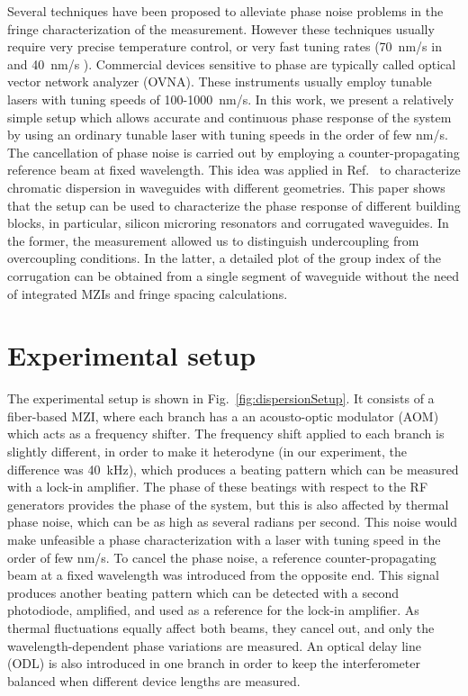 \documentclass[journal]{IEEEtran}
\begin{document}
Several techniques have been proposed to alleviate phase noise problems in the fringe characterization of the measurement.
However these techniques usually require very precise temperature control, or very fast tuning rates (70~nm/s in \cite{Vanwiggeren2003} and 40~nm/s \cite{Gifford2005}).
Commercial devices sensitive to phase are typically called optical vector network analyzer (OVNA).
These instruments usually employ tunable lasers with tuning speeds of 100-1000~nm/s.
In this work, we present a relatively simple setup which allows accurate and continuous phase response of the system by using an ordinary tunable laser with tuning speeds in the order of few nm/s.
The cancellation of phase noise is carried out by employing a counter-propagating reference beam at fixed wavelength.
This idea was applied in Ref.~\cite{Mas2012} to characterize chromatic dispersion in waveguides with different geometries.
This paper shows that the setup can be used to characterize the phase response of different building blocks, in particular, silicon microring resonators and corrugated waveguides.
In the former, the measurement allowed us to distinguish undercoupling from overcoupling conditions.
In the latter, a detailed plot of the group index of the corrugation can be obtained from a single segment of waveguide without the need of integrated MZIs and fringe spacing calculations.


\section{Experimental setup}
The experimental setup is shown in Fig.~\ref{fig:dispersionSetup}.
It consists of a fiber-based MZI, where each branch has a an acousto-optic modulator (AOM) which acts as a frequency shifter.
The frequency shift applied to each branch is slightly different, in order to make it heterodyne (in our experiment, the difference was 40~kHz), which produces a beating pattern which can be measured with a lock-in amplifier.
The phase of these beatings with respect to the RF generators provides the phase of the system, but this is also affected by thermal phase noise, which can be as high as several radians per second.
This noise would make unfeasible a phase characterization with a laser with tuning speed in the order of few nm/s. To cancel the phase noise, a reference counter-propagating beam at a fixed wavelength was introduced from the opposite end.
This signal produces another beating pattern which can be detected with a second photodiode, amplified, and used as a reference for the lock-in amplifier.
As thermal fluctuations equally affect both beams, they cancel out, and only the wavelength-dependent phase variations are measured.
An optical delay line (ODL) is also introduced in one branch in order to keep the interferometer balanced when different device lengths are measured. 
\end{document}
